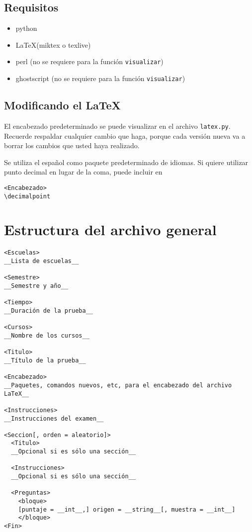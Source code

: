 \documentclass[12pt]{article}
\theoremstyle{definition}
\begin{document}
\subsection{Requisitos}
\begin{itemize}
  \item python
  \item \LaTeX (miktex o texlive)
  \item perl (no se requiere para la función \verb|visualizar|)
  \item ghostscript (no se requiere para la función \verb|visualizar|)
\end{itemize}

\subsection{Modificando el \LaTeX}
El encabezado predeterminado se puede visualizar en el archivo \verb|latex.py|. Recuerde respaldar cualquier cambio que haga, porque cada versión nueva va a borrar los cambios que usted haya realizado.

Se utiliza el español como paquete predeterminado de idiomas. Si quiere utilizar punto decimal en lugar de la coma, puede incluir en 
\begin{verbatim}
<Encabezado>
\decimalpoint
\end{verbatim}

\section{Estructura del archivo general}
\begin{verbatim}
<Escuelas>
__Lista de escuelas__

<Semestre>
__Semestre y año__

<Tiempo>
__Duración de la prueba__

<Cursos>
__Nombre de los cursos__

<Titulo>
__Título de la prueba__

<Encabezado>
__Paquetes, comandos nuevos, etc, para el encabezado del archivo LaTeX__

<Instrucciones>
__Instrucciones del examen__

<Seccion[, orden = aleatorio]>
  <Titulo>
  __Opcional si es sólo una sección__

  <Instrucciones>
  __Opcional si es sólo una sección__

  <Preguntas>
    <bloque>
    [puntaje = __int__,] origen = __string__[, muestra = __int__]
    </bloque>
<Fin>
\end{verbatim}
\end{document}
